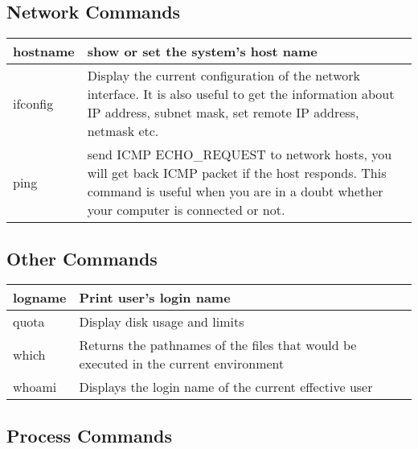 \subsection{Network Commands}

\begin{tabular}{|p{}|p{}|} \hline
hostname  & show or set the system's host name \\ \hline
ifconfig  & Display the current configuration of the network interface. It is also useful to get the information about IP address, subnet mask, set remote IP address, netmask etc. \\ \hline
ping      & send ICMP ECHO\_REQUEST to network hosts, you will get back ICMP packet if the host responds.  This command is useful when you are in a doubt whether your computer is connected or not. \\ \hline
\end{tabular}


\subsection{Other Commands}
\begin{tabular}{|p{}|p{}|} \hline
logname & Print user's login name \\ \hline
quota   & Display disk usage and limits \\ \hline
which   & Returns the pathnames of the files that would be executed in the current environment \\ \hline
whoami  & Displays the login name of the current effective user \\ \hline
\end{tabular}

\subsection{Process Commands}

